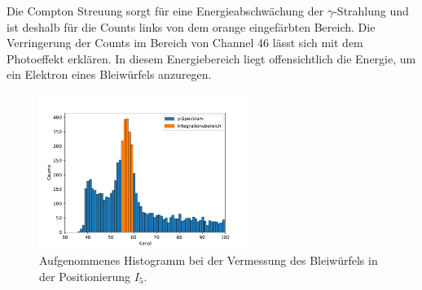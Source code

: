 Die Compton Streuung sorgt für eine Energieabschwächung der $\gamma$-Strahlung und ist deshalb für die Counts links von dem %
orange eingefärbten Bereich. Die Verringerung der Counts im Bereich von Channel 46 lässt sich mit dem Photoeffekt erklären.
In diesem Energiebereich liegt offensichtlich die Energie, um ein Elektron eines Bleiwürfels anzuregen.  %

\begin{figure}[h]
  \centering
  \includegraphics[width=0.6\textwidth]{hist/hist.pdf}
  \caption{Aufgenommenes Histogramm bei der Vermessung des Bleiwürfels in der Positionierung $I_5$.}
  \label{fig: histo}
\end{figure}
